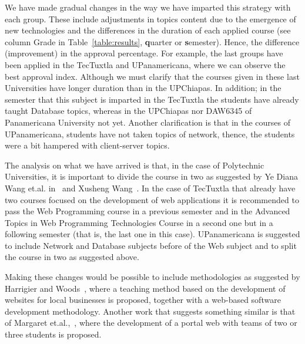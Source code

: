 We have made gradual changes in the way we have imparted this strategy with each group. 
These include adjustments in topics content due to the emergence of new technologies 
and the differences in the duration of each applied course 
(see column Grade in Table~\ref{table:results}, \textbf{q}uarter or \textbf{s}emester).
Hence, the difference (improvement) in the approval percentage. 
For example, the last groups have been applied in the TecTuxtla and UPanamericana, 
where we can observe the best approval index. Although we must clarify that the 
courses given in these last Universities have longer duration than in the UPChiapas.
In addition; in the semester that this subject is imparted in the TecTuxtla the 
students have already taught Database topics, whereas in the UPChiapas nor DAW6345 of 
Panamericana University not yet. Another clarification is that in the courses of 
UPanamericana, students have not taken topics of network, thence, the students 
were a bit hampered with client-server topics.

The analysis on what we have arrived is that, in the case of Polytechnic Universities, 
it is important to divide the course in two as suggested by Ye Diana Wang et.al. in~\cite{9Wang2009} 
and Xusheng Wang~\cite{8Wang2014}. 
In the case of TecTuxtla that already have two courses focused on the development of web 
applications it is recommended to pass the Web Programming course in a previous semester and 
in the Advanced Topics in Web Programming Technologies Course in a second one but in a 
following semester (that is, the last one in this case). UPanamericana is suggested to include 
Network and Database subjects before of the Web subject and to split the course
in two as suggested above. 

Making these changes would be possible to include methodologies as suggested by Harrigier and 
Woods~\cite{3Harriger2001}, where a teaching method based on the development of websites for local 
businesses is proposed, together with a web-based software development methodology. 
Another work that suggests something similar is that of Margaret et.al.,~\cite{6Margaret2016}, 
where the development of a portal web with teams of two or three students is proposed.